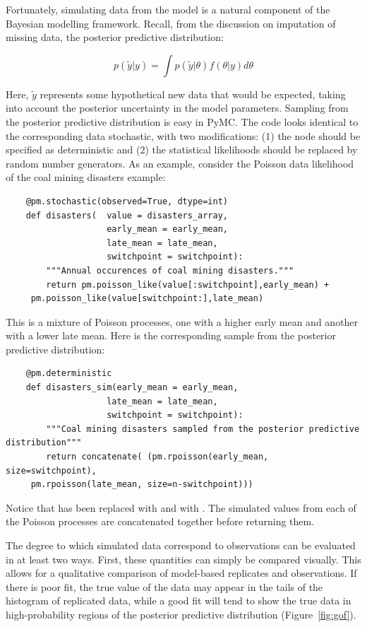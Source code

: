 Fortunately, simulating data from the model is a natural component of the Bayesian modelling framework. Recall, from the discussion on imputation of missing data, the posterior predictive distribution:

\begin{equation}
	p(\tilde{y}|y) = \int p(\tilde{y}|\theta) f(\theta|y) d\theta
\end{equation}

Here, $\tilde{y}$ represents some hypothetical new data that would be expected, taking into account the posterior uncertainty in the model parameters. Sampling from the posterior predictive distribution is easy in PyMC. The code looks identical to the corresponding data stochastic, with two modifications: (1) the node should be specified as deterministic and (2) the statistical likelihoods should be replaced by random number generators. As an example, consider the Poisson data likelihood of the coal mining disasters example:
\begin{verbatim}
	@pm.stochastic(observed=True, dtype=int)
	def disasters(  value = disasters_array, 
	                early_mean = early_mean, 
	                late_mean = late_mean, 
	                switchpoint = switchpoint):
	    """Annual occurences of coal mining disasters."""
	    return pm.poisson_like(value[:switchpoint],early_mean) +
	 pm.poisson_like(value[switchpoint:],late_mean)
\end{verbatim}
This is a mixture of Poisson processes, one with a higher early mean and another with a lower late mean. Here is the corresponding sample from the posterior predictive distribution:
\begin{verbatim}
	@pm.deterministic
	def disasters_sim(early_mean = early_mean, 
	                late_mean = late_mean, 
	                switchpoint = switchpoint):
	    """Coal mining disasters sampled from the posterior predictive distribution"""
	    return concatenate( (pm.rpoisson(early_mean, size=switchpoint),
	 pm.rpoisson(late_mean, size=n-switchpoint)))
\end{verbatim}
Notice that  has been replaced with  and  with . The simulated values from each of the Poisson processes are concatenated together before returning them.

The degree to which simulated data correspond to observations can be evaluated in at least two ways. First, these quantities can simply be compared visually. This allows for a qualitative comparison of model-based replicates and observations. If there is poor fit, the true value of the data may appear in the tails of the histogram of replicated data, while a good fit will tend to show the true data in high-probability regions of the posterior predictive distribution (Figure~\ref{fig:gof}). 

